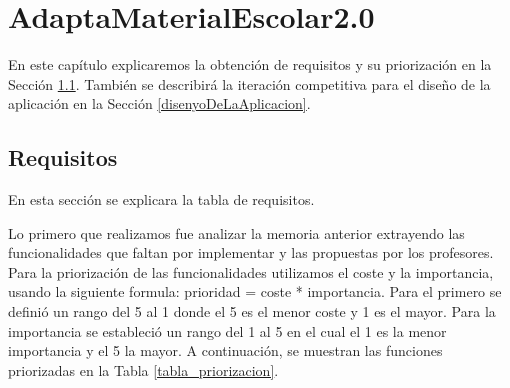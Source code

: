 \chapter{AdaptaMaterialEscolar2.0}
\label{cap:AdaptaMaterialEscolar2.0}
En este capítulo explicaremos la obtención de requisitos y su priorización en la Sección \ref{cap:requisitos}. También se describirá la iteración competitiva para el diseño de la aplicación en la Sección \ref{disenyoDeLaAplicacion}.

\section{Requisitos}
\label{cap:requisitos}
En esta sección se explicara la tabla de requisitos.

Lo primero que realizamos fue analizar la memoria anterior extrayendo las funcionalidades que faltan por implementar y las propuestas por los profesores. Para la priorización de las funcionalidades utilizamos el coste y la importancia, usando la siguiente formula: prioridad = coste * importancia. Para el primero se definió un rango del 5 al 1 donde el 5 es el menor coste y 1 es el mayor. Para la importancia se estableció un rango del 1 al 5 en el cual el 1 es la menor importancia y el 5 la mayor. A continuación, se muestran las funciones priorizadas en la Tabla \ref{tabla_priorizacion}.
\\
